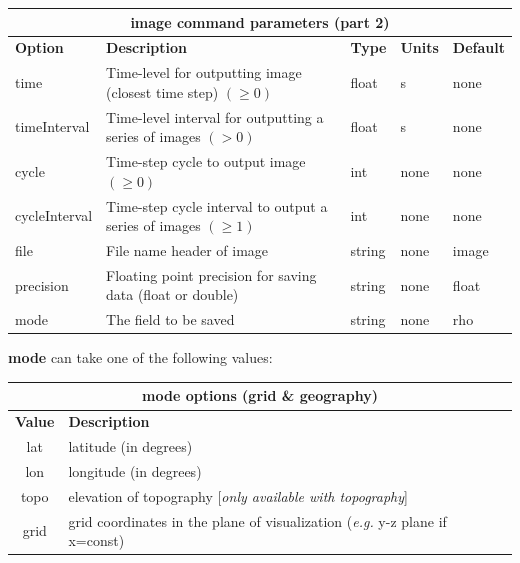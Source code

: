 \documentclass[11pt]{report}
\begin{document}
\begin{center}
\begin{tabular}{|l|p{8cm}|l|l|l|} \hline
\multicolumn{5}{|c|}{\bf image command parameters (part 2)}\\ \hline
\bf{Option} & \bf{Description}                             & \bf{Type} & \bf{Units} & \bf{Default} \\ 
\hline \hline
time          & Time-level for outputting image (closest time step) $(\geq 0)$ & float  & s    & none \\ \hline
timeInterval  & Time-level interval for outputting a series of images $(> 0)$  & float  & s    & none \\ \hline
cycle         & Time-step cycle to output image $(\geq 0)$                     & int    & none & none \\ \hline
cycleInterval & Time-step cycle interval to output a series of images $(\geq 1)$ & int    & none & none \\ \hline\hline
file          & File name header of image                                   & string & none & image \\ \hline
precision     & Floating point precision for saving data (float or double)  & string & none & float \\ \hline
mode          & The field to be saved                                       & string & none & rho \\ \hline
\end{tabular}
\end{center}
%
{\bf mode} can take one of the following values:
%
\begin{center}
\begin{tabular}{|c|l|} \hline
\multicolumn{2}{|c|}{\bf mode options (grid \& geography)}\\ \hline
\bf{Value} & \bf{Description} \\ 
\hline  \hline
lat     & latitude (in degrees)  \\ \hline
lon     & longitude (in degrees) \\ \hline
topo    & elevation of topography [\emph{only available with topography}]\\ \hline
grid    & grid coordinates in the plane of visualization (\emph{e.g.} y-z plane if x=const) \\ \hline
\end{tabular}
\end{center}
\end{document}
